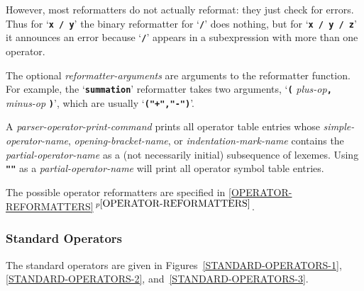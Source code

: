\documentclass[12pt]{article}
\newcommand{\TT}[1]{{\tt \bfseries #1}}
\newcommand{\itemref}[1]{\ref{#1}$\,^{p\pageref{#1}}$}
\begin{document}
However, most reformatters do not actually reformat: they just check
for errors.  Thus for `\TT{x / y}' the binary reformatter for `\TT{/}'
does nothing, but for `\TT{x / y / z}' it announces an error because
`\TT{/}' appears in a subexpression with more than one operator.

The optional {\em reformatter-arguments} are arguments to the reformatter
function.  For example, the `\TT{summation}' reformatter takes two
arguments, `\TT{(} {\em plus-op}\TT{,} {\em minus-op} \TT{)}', which
are usually `\TT{("+","-")}'.

A {\em parser-operator-print-command}
prints all operator table entries whose
{\em simple-operator-name},
{\em opening-bracket-name}, or
{\em indentation-mark-name}
contains the {\em partial-operator-name}
as a (not necessarily initial) subsequence of lexemes.  Using \TT{""} as
a {\em partial-operator-name} will print all operator
symbol table entries.

The possible operator reformatters are specified
in \itemref{OPERATOR-REFORMATTERS}.

\subsubsection{Standard Operators}
\label{STANDARD-OPERATORS}

The standard operators are given in Figures~\ref{STANDARD-OPERATORS-1},
\ref{STANDARD-OPERATORS-2},
and~\ref{STANDARD-OPERATORS-3}.
\end{document}
